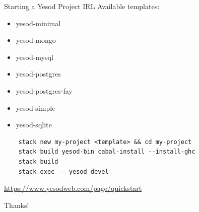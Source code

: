 \documentclass[pdf]{beamer}
\begin{document}

\begin{frame}[fragile]{Starting a Yesod Project IRL}
  Available templates:
  \begin{itemize}
  \item yesod-minimal
  \item yesod-mongo
  \item yesod-mysql
  \item yesod-postgres
  \item yesod-postgres-fay
  \item yesod-simple
  \item yesod-sqlite
  \end{itemize}
  \begin{verbatim}
    stack new my-project <template> && cd my-project
    stack build yesod-bin cabal-install --install-ghc
    stack build
    stack exec -- yesod devel
  \end{verbatim}
  \url{https://www.yesodweb.com/page/quickstart}
\end{frame}

\begin{frame}{Thanks!}
  
\end{frame}
\end{document}
